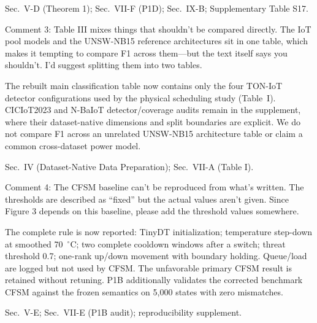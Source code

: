 \documentclass[10pt,a4paper]{article}
\begin{document}
\begin{wherebox}
Sec.~V-D (Theorem 1); Sec.~VII-F (P1D); Sec.~IX-B; Supplementary Table S17.
\end{wherebox}

\begin{rcommentbox}
Comment 3: Table III mixes things that shouldn't be compared directly. The IoT pool models and the UNSW-NB15 reference architectures sit in one table, which makes it tempting to compare F1 across them---but the text itself says you shouldn't. I'd suggest splitting them into two tables.
\end{rcommentbox}

\begin{authorresponsebox}
The rebuilt main classification table now contains only the four TON-IoT detector configurations used by the physical scheduling study (Table~I). CICIoT2023 and N-BaIoT detector/coverage audits remain in the supplement, where their dataset-native dimensions and split boundaries are explicit. We do not compare F1 across an unrelated UNSW-NB15 architecture table or claim a common cross-dataset power model.
\end{authorresponsebox}

\begin{wherebox}
Sec.~IV (Dataset-Native Data Preparation); Sec.~VII-A (Table I).
\end{wherebox}

\begin{rcommentbox}
Comment 4: The CFSM baseline can't be reproduced from what's written. The thresholds are described as ``fixed'' but the actual values aren't given. Since Figure 3 depends on this baseline, please add the threshold values somewhere.
\end{rcommentbox}

\begin{authorresponsebox}
The complete rule is now reported: TinyDT initialization; temperature step-down at smoothed 70~$^{\circ}$C; two complete cooldown windows after a switch; threat threshold 0.7; one-rank up/down movement with boundary holding. Queue/load are logged but not used by CFSM. The unfavorable primary CFSM result is retained without retuning. P1B additionally validates the corrected benchmark CFSM against the frozen semantics on 5{,}000 states with zero mismatches.
\end{authorresponsebox}

\begin{wherebox}
Sec.~V-E; Sec.~VII-E (P1B audit); reproducibility supplement.
\end{wherebox}
\end{document}
